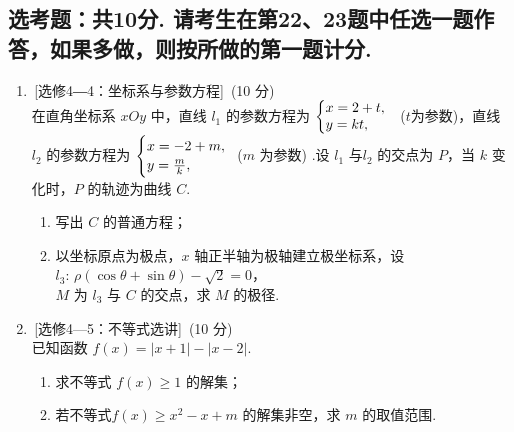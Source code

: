 \documentclass[12pt,space]{ctexart} %
\begin{document}
\subsection{选考题：共10分. 请考生在第22、23题中任选一题作答，如果多做，则按所做的第一题计分. }
\begin{enumerate}[resume]%
\item \,[选修4―4：坐标系与参数方程]\, (10 分)\\
在直角坐标系 $xOy$ 中，直线 $l_1$ 的参数方程为 $\biggl\{\begin{array}{@{}l}
x=2+t,\\y=kt,
\end{array}$\, ($t$为参数)，直线 $l_2$ 的参数方程为 $\Biggl\{\begin{array}{@{}l}
x=-2+m,\\[0.5mm]y=\frac{m}{k},
\end{array}$ ($m$ 为参数)
.设 $l_1$ 与$l_2$ 的交点为 $P$，当 $k$ 变化时，$P$ 的轨迹为曲线 $C$.
\begin{enumerate}[itemsep=-0.3em,label={(\arabic*)},topsep=0pt,labelsep=.5em,leftmargin=1.7em]
	\item 写出 $C$ 的普通方程；
	\item 以坐标原点为极点，$x$ 轴正半轴为极轴建立极坐标系，设 $l_3\colon\,\rho(\cos\theta+\sin\theta)-\sqrt{2}=0$，\\
	$M$ 为 $l_3$ 与 $C$ 的交点，求 $M$ 的极径.
\end{enumerate}
\item \,[选修4—5：不等式选讲]\, (10 分)\\
已知函数 $f(x)=|x+1|-|x-2|$.
\begin{enumerate}[itemsep=-0.3em,label={(\arabic*)},topsep=0pt,labelsep=.5em,leftmargin=1.7em]
	\item 求不等式 $f(x)\geqslant1$ 的解集；
	\item 若不等式$f(x)\geqslant x^2-x+m$ 的解集非空，求 $m$ 的取值范围.
\end{enumerate}
\end{enumerate}
 



\clearpage
\end{document}
